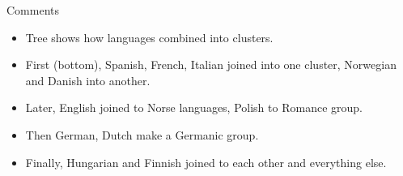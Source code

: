 \documentclass[unknownkeysallowed]{beamer}\usepackage[]{graphicx}\usepackage[]{color}
\begin{document}
\begin{frame}[fragile]{Comments}
  
  \begin{itemize}
  \item Tree shows how languages combined into clusters.
  \item First (bottom), Spanish, French, Italian joined into one
    cluster, Norwegian and Danish into another.
  \item Later, English joined to Norse languages, Polish to Romance group.
  \item Then German, Dutch make a Germanic group.
  \item Finally, Hungarian and Finnish joined to each other and
    everything else.
  \end{itemize}
  
\end{frame}
\end{document}
